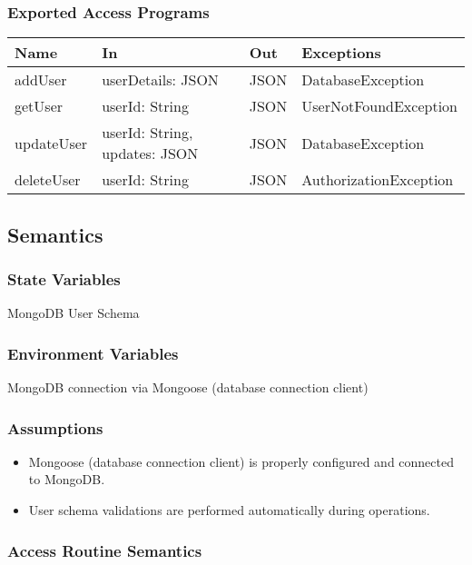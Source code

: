 \documentclass[12pt, titlepage]{article}
\begin{document}
\subsubsection{Exported Access Programs}

\begin{center}
\begin{tabular}{p{2cm} p{4cm} p{2cm} p{4cm}}
\hline
\textbf{Name} & \textbf{In} & \textbf{Out} & \textbf{Exceptions} \\
\hline
addUser & userDetails: JSON & JSON & DatabaseException \\
getUser & userId: String & JSON & UserNotFoundException \\
updateUser & userId: String, updates: JSON & JSON & DatabaseException \\
deleteUser & userId: String & JSON & AuthorizationException \\
\hline
\end{tabular}
\end{center}

\subsection{Semantics}

\subsubsection{State Variables}
MongoDB User Schema

\subsubsection{Environment Variables}
MongoDB connection via Mongoose (database connection client)

\subsubsection{Assumptions}
\begin{itemize}
  \item Mongoose (database connection client) is properly configured and connected to MongoDB.
  \item User schema validations are performed automatically during operations.
\end{itemize}

\subsubsection{Access Routine Semantics}
\end{document}
